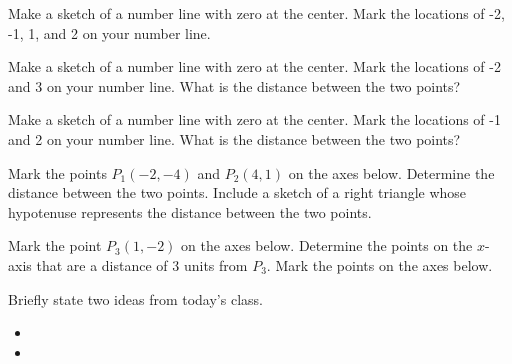 
\begin{problem}
\item Make a sketch of a number line with zero at the center.
  Mark the locations of -2, -1, 1, and 2 on your number line.

  \vfill

\item Make a sketch of a number line with zero at the center.
  Mark the locations of -2 and 3 on your number line. What is the
  distance between the two points?

  \vfill

\item Make a sketch of a number line with zero at the center.
  Mark the locations of -1 and 2 on your number line. What is the
  distance between the two points?

  \vfill

\end{problem}


\begin{problem}
\item Mark the points $P_1(-2,-4)$ and $P_2(4,1)$ on the axes
  below. Determine the distance between the two points.  Include a
  sketch of a right triangle whose hypotenuse represents the distance
  between the two points.

  \scalebox{0.95}{}

  \vfill

  \clearpage

\item Mark the point $P_3(1,-2)$ on the axes below. Determine the
  points on the $x$-axis that are a distance of 3 units from $P_3$.
   Mark the points on
  the axes below.

  \scalebox{0.95}{}

  \vfill
\end{problem}


\postClass

\begin{problem}
\item Briefly state two ideas from today's class.
  \begin{itemize}
  \item 
  \item 
  \end{itemize}
\item 
  \begin{subproblem}
    \item
  \end{subproblem}
\end{problem}

